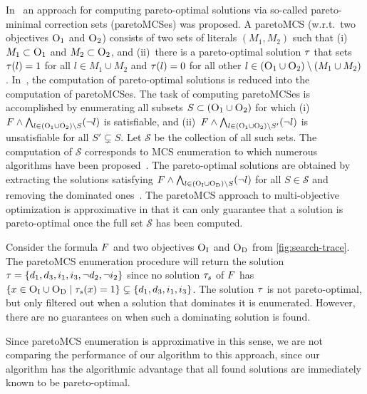 In~\textcite{DBLP:conf/ijcai/Terra-NevesLM18a,DBLP:conf/aaai/Terra-NevesLM18,DBLP:conf/ijcai/Terra-NevesLM18} an approach for computing pareto-optimal solutions via so-called pareto-minimal correction sets (paretoMCSes) was proposed.
A paretoMCS (w.r.t.\ two objectives $\textsc{O}_1$ and $\textsc{O}_2$) consists of two sets of literals $(M_1, M_2)$ such that (i)~$M_1 \subset \textsc{O}_1$ and $M_2 \subset \textsc{O}_2$, and (ii)~there is a pareto-optimal solution $\tau$ that sets $\tau(l) = 1$ for all $l \in M_1 \cup M_2$ and $\tau(l) = 0$ for all other $l \in (\textsc{O}_1 \cup \textsc{O}_2) \setminus (M_1 \cup M_2)$.
In~\textcite{DBLP:conf/ijcai/Terra-NevesLM18a}, the computation of pareto-optimal solutions is reduced into the computation of paretoMCSes.
The task of computing paretoMCSes is accomplished by enumerating all subsets $S \subset  (\textsc{O}_1 \cup \textsc{O}_2)$ for which (i)~$F \land \bigwedge_{l \in  (\textsc{O}_1 \cup \textsc{O}_2) \setminus S} (\lnot l)$ is satisfiable, and (ii)~$F \land \bigwedge_{l \in  (\textsc{O}_1 \cup \textsc{O}_2) \setminus S'} (\lnot l)$ is unsatisfiable for all $S' \subsetneq S$.
Let $\mathcal{S}$ be the collection of all such sets.
The computation of $\mathcal{S}$ corresponds to MCS enumeration to which numerous algorithms have been proposed~\autocite{DBLP:conf/lpar/BendikC20,DBLP:conf/hvc/MorgadoLM12,DBLP:conf/sat/PrevitiMJM17}.
The pareto-optimal solutions are obtained by extracting the solutions satisfying $F \land \bigwedge_{l \in  (\textsc{O}_{\text{I}} \cup \textsc{O}_{\text{D}}) \setminus S} (\lnot l)$ for all $S \in \mathcal{S}$ and removing the dominated ones~\autocite{DBLP:conf/ijcai/Terra-NevesLM18a}.
The paretoMCS approach to multi-objective optimization is approximative in that it can only guarantee that a solution is pareto-optimal once the full set $\mathcal{S}$ has been computed.
\begin{example}\label{ex:MCS}
  Consider the formula $F$ and two objectives $\textsc{O}_{\text{I}}$ and $\textsc{O}_{\text{D}}$ from \cref{fig:search-trace}.
  The paretoMCS enumeration procedure will return the solution $\tau = \{d_1, d_3, i_1, i_3, \lnot d_2, \lnot i_2\}$ since no solution $\tau_s$ of $F$ has $\{x \in \textsc{O}_{\text{I}} \cup \textsc{O}_{\text{D}} \mid  \tau_s(x) = 1\} \subsetneq \{d_1, d_3, i_1, i_3\}$.
  The solution $\tau$ is not pareto-optimal, but only filtered out when a solution that dominates it is enumerated.
  However, there are no guarantees on when such a dominating solution is found. 
\end{example}
Since paretoMCS enumeration is approximative in this sense, we are not comparing the performance of our algorithm to this approach, since our algorithm has the algorithmic advantage that all found solutions are immediately known to be pareto-optimal.

